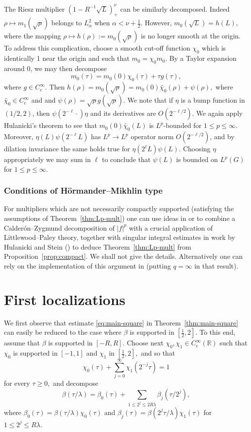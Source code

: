 \documentclass[leqno]{amsart}
\theoremstyle{definition}
\theoremstyle{remark}
\numberwithin{equation}{section}
\newcommand{\R}{\mathbb{R}}
\newcommand\la{{\lambda}}
\newcommand\Coi{{C^\infty_{\mathrm c}}}
\begin{document}
The Riesz multiplier $(1-R^{-1} \sqrt L)_+^\nu$ can be similarly decomposed.  
Indeed  $\rho \mapsto m_1(\sqrt \rho)$    
belongs  to $L^2_\alpha$ when $\alpha< \nu+\frac 12$.
However, $m_0(\sqrt{L})=h(L),$ where the mapping $\rho\mapsto h(\rho):=m_0 (\sqrt \rho)$ is no longer smooth at the origin. 
To address this complication,  choose a smooth cut-off function $\chi_0$ which is identically 1 near the origin and such that $m_0=\chi_0 m_0.$ By a Taylor expansion around $0$, we may then decompose 
$$
m_0(\tau)=m_0(0)\chi_0(\tau)+\tau g(\tau),
$$
where  $g\in \Coi .$   Then $h(\rho)=m_0 (\sqrt \rho)=m_0(0)\widetilde{\chi_0}(\rho)+\psi(\rho),$ where $\widetilde{\chi_0}\in \Coi $ and and   $\psi(\rho)=\sqrt \rho g(\sqrt \rho)$. We note that if 
$\eta$ is a bump function in $(1/2,2)$, then $ \psi(2^{-\ell}\cdot)\eta$ and its derivatives  are $O(2^{-\ell/2})$. We again apply  Hulanicki's theorem to see that $m_0(0)\widetilde{\chi_0}(L)$ is $L^p$-bounded for $1\le p\le \infty$.
Moreover, $\eta(L)\psi(2^{-\ell} L)$ has $L^p\to L^p$ operator norm $O(2^{-\ell/2})$, and by dilation invariance the same holds true for  $\eta(2^{\ell}L )\psi(L)$.   Choosing $\eta $ appropriately we may sum in $\ell$ to conclude that  $\psi(L)$ is bounded on $L^p(G)$ for $1\le p\le \infty$. 

\subsubsection*{Conditions of Hörmander--Mikhlin type}
For multipliers which are not necessarily compactly supported (satisfying the assumptions of  Theorem~\ref{thm:Lp-mult})  one can use ideas  in \cite{carbery-revista} or \cite{Seeger-Crelle1986, See88} to combine a Calderón--Zygmund decomposition of $|f|^p$ with a crucial  application of Littlewood--Paley theory, together with singular integral estimates in work by Hulanicki and Stein (\cite{FoSt82, Hu84}) to deduce Theorem~\ref{thm:Lp-mult} from Proposition~\ref{prop:compact}. We shall not give the details. Alternatively one can rely on  the implementation of this argument in 
\cite[Thm. I.19] {ChenOuhabazSikoraYan} (putting $q=\infty$ in that result). 



\section{First localizations} \label{sec:localization} 

We first observe that estimate \eqref{eq:main-square} in Theorem~\ref{thm:main-square} can easily be reduced to the case where $\beta$ is supported in $[\frac{1}{2},2]$. To this end, assume that $\beta$ is supported in $[-R, R].$ Choose next $\chi_0, \chi_1\in \Coi (\R)$ such that $\chi_0$ is supported in $[-1,1]$ and $\chi_1$ in $[\frac{1}{2}, 2],$ and so that 
$$\chi_0(\tau)+\sum_{j=0}^\infty \chi_1(2^{-j} \tau)=1$$
 for every $\tau\ge 0,$ and decompose
$$
\beta(\tau/\la)=\beta_0(\tau)+\sum_{1\le 2^j\le 2R\la} \beta_j(\tau/2^j),
$$
where $\beta_0(\tau)=\beta(\tau/\la)\chi_0(\tau)$ and $\beta_j(\tau)=\beta(2^{j}\tau/\la) \chi_1(\tau)$ for $1\le 2^j\le R\la.$ 
\end{document}

